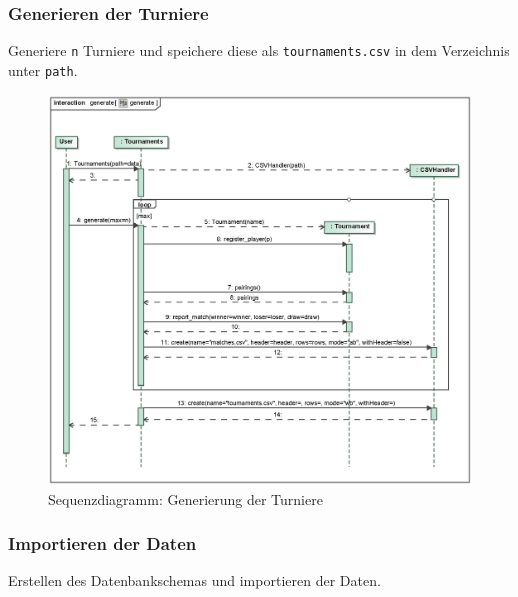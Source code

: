 \subsubsection{Generieren der Turniere}
Generiere \verb|n| Turniere und speichere diese als \verb|tournaments.csv| in dem Verzeichnis unter \verb|path|.

\begin{figure}[H]
    \myfloatalign
    \includegraphics[width=1.1\textwidth]{gfx/MtGDeepAnalysis/cli_generate.eps}
    \caption{Sequenzdiagramm: Generierung der Turniere}
    \label{fig:seq:generate}
\end{figure}


\subsubsection{Importieren der Daten}
Erstellen des Datenbankschemas und importieren der Daten.

